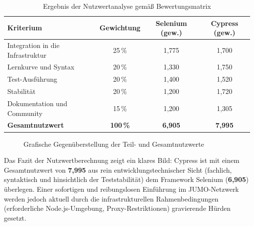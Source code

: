 \begin{table}[htbp]
\centering
\caption{Ergebnis der Nutzwertanalyse gemäß Bewertungsmatrix}
\label{tab:nutzwert_ergebnis}
\renewcommand{\arraystretch}{1.2}
\begin{tabular}{lccc}
\hline
\textbf{Kriterium} & \textbf{Gewichtung} & \textbf{Selenium (gew.)} & \textbf{Cypress (gew.)} \\ \hline
Integration in die Infrastruktur & 25\,\% & 1,775 & 1,700 \\ 
Lernkurve und Syntax             & 20\,\% & 1,330 & 1,750 \\ 
Test-Ausführung                  & 20\,\% & 1,400 & 1,520 \\ 
Stabilität                       & 20\,\% & 1,200 & 1,720 \\ 
Dokumentation und Community      & 15\,\% & 1,200 & 1,305 \\ \hline
\textbf{Gesamtnutzwert}          & \textbf{100\,\%} & \textbf{6,905} & \textbf{7,995} \\ \hline
\end{tabular}
\end{table}

\begin{figure}[htbp]
    \centering
    \caption{Grafische Gegenüberstellung der Teil- und Gesamtnutzwerte}
    \label{fig:nutzwert_diagramm}
\end{figure}

Das Fazit der Nutzwertberechnung zeigt ein klares Bild: Cypress ist mit einem Gesamtnutzwert von \textbf{7,995} aus rein entwicklungstechnischer Sicht (fachlich, syntaktisch und hinsichtlich der Teststabilität) dem Framework Selenium (\textbf{6,905}) überlegen. Einer sofortigen und reibungslosen Einführung im JUMO-Netzwerk werden jedoch aktuell durch die infrastrukturellen Rahmenbedingungen (erforderliche Node.js-Umgebung, Proxy-Restriktionen) gravierende Hürden gesetzt.